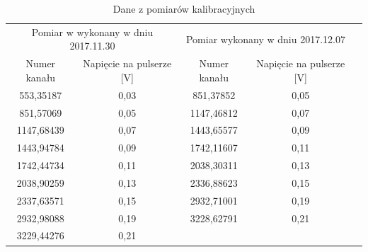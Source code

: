 \documentclass[12pt,a4paper]{article}
\begin{document}
\begin{table}[H]
\centering
\caption{Dane z pomiarów kalibracyjnych}
\label{kalibracja_tab}
\begin{tabular}{|c|c|ccl}
\cline{1-4}
\multicolumn{2}{|c|}{Pomiar w wykonany w dniu 2017.11.30} & \multicolumn{2}{c|}{Pomiar wykonany w dniu 2017.12.07}                                &  \\ \cline{1-4}
Numer kanału        & Napięcie na pulserze {[}V{]}        & \multicolumn{1}{c|}{Numer kanału} & \multicolumn{1}{c|}{Napięcie na pulserze {[}V{]}} &  \\ \cline{1-4}
553,35187           & 0,03                                & \multicolumn{1}{c|}{851,37852}    & \multicolumn{1}{c|}{0,05}                         &  \\ \cline{1-4}
851,57069           & 0,05                                & \multicolumn{1}{c|}{1147,46812}   & \multicolumn{1}{c|}{0,07}                         &  \\ \cline{1-4}
1147,68439          & 0,07                                & \multicolumn{1}{c|}{1443,65577}   & \multicolumn{1}{c|}{0,09}                         &  \\ \cline{1-4}
1443,94784          & 0,09                                & \multicolumn{1}{c|}{1742,11607}   & \multicolumn{1}{c|}{0,11}                         &  \\ \cline{1-4}
1742,44734          & 0,11                                & \multicolumn{1}{c|}{2038,30311}   & \multicolumn{1}{c|}{0,13}                         &  \\ \cline{1-4}
2038,90259          & 0,13                                & \multicolumn{1}{c|}{2336,88623}   & \multicolumn{1}{c|}{0,15}                         &  \\ \cline{1-4}
2337,63571          & 0,15                                & \multicolumn{1}{c|}{2932,71001}   & \multicolumn{1}{c|}{0,19}                         &  \\ \cline{1-4}
2932,98088          & 0,19                                & \multicolumn{1}{c|}{3228,62791}   & \multicolumn{1}{c|}{0,21}                         &  \\ \cline{1-4}
3229,44276          & 0,21                                &                                   &                                                   &  \\ \cline{1-2}
\end{tabular}
\end{table}
\end{document}
